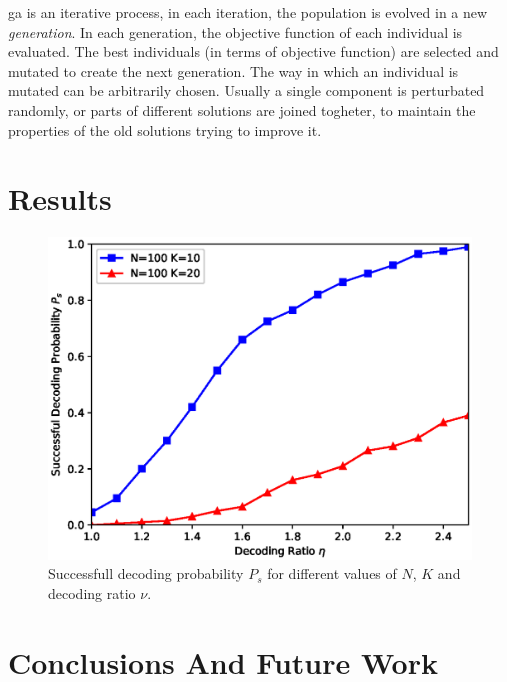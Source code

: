 \documentclass[journal]{IEEEtran}
\begin{document}
\gls{ga} is an iterative process, in each iteration, the population is evolved in a new \textit{generation}.
In each generation, the objective function of each individual is evaluated. The best individuals (in terms of objective function) are selected and mutated to create the next generation.
The way in which an individual is mutated can be arbitrarily chosen.
Usually a single component is perturbated randomly, or parts of different solutions are joined togheter, to maintain the properties of the old solutions trying to improve it.

\section{Results}
\label{sec:results}
\begin{figure}
  \centering
	    \includegraphics[width=0.9\columnwidth]{ratiovsprob.eps}
  \caption{Successfull decoding probability $P_s$ for different values of $N$, $K$ and decoding ratio $\nu$.}
  \label{fig:ratiovsprob}
\end{figure}

\section{Conclusions And Future Work}
\label{sec:conclusions}



\end{document}
